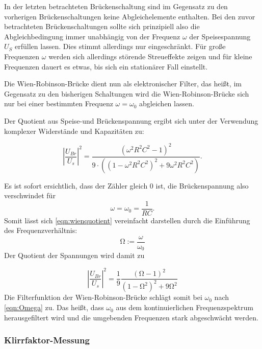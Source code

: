 In der letzten betrachteten Brückenschaltung sind im Gegensatz zu den vorherigen Brückenschaltungen keine Abgleichelemente enthalten.
Bei den zuvor betrachteten Brückenschaltungen sollte sich prinzipiell also die Abgleichbedingung immer unabhängig von der Frequenz $\omega$ der Speisespannung $U_S$ erfüllen lassen. Dies stimmt allerdings nur eingeschränkt. Für große Frequenzen $\omega$ werden sich allerdings störende Streueffekte zeigen und für kleine Frequenzen dauert es etwas, bis sich ein stationärer Fall einstellt.

Die Wien-Robinson-Brücke dient nun als elektronischer Filter, das heißt, im Gegensatz zu den bisherigen Schaltungen wird die Wien-Robinson-Brücke sich nur bei einer bestimmten Frequenz $\omega=\omega_0$ abgleichen lassen.

Der Quotient aus Speise-und Brückenspannung ergibt sich unter der Verwendung komplexer Widerstände und Kapazitäten zu:

\begin{equation}
\label{eqn:wienquotient}
\left|\frac{U_{Br}}{U_s}\right|^2= \frac{(\omega^2R^2C^2-1)^2}{9 \cdot ((1-\omega^2R^2C^2)^2+9\omega^2R^2C^2)} \text{.}
\end{equation}

Es ist sofort ersichtlich, dass der Zähler gleich $0$ ist, die Brückenspannung also verschwindet für
\begin{equation}
  \label{eqn:Omega}
\omega=\omega_0=\frac{1}{RC} .
\end{equation}
Somit lässt sich \eqref{eqn:wienquotient} vereinfacht darstellen durch die Einführung des Frequenzverhältnis:
\begin{equation}
\si{\ohm}:=\frac{\omega}{\omega_0}
\end{equation}
Der Quotient der Spannungen wird damit zu

\begin{equation}
\label{eqn:wienquotienteinfach}
\left|\frac{U_{Br}}{U_s}\right|^2= \frac{1}{9}\frac{(\si{\ohm}-1)^2}{(1-\si{\ohm}^2)^2+9\si{\ohm}^2}
\end{equation}
Die Filterfunktion der Wien-Robinson-Brücke schlägt somit bei $\omega_0$ nach \eqref{eqn:Omega} zu. Das heißt, dass $\omega_0$ aus dem kontinuierlichen Frequenzspektrum herausgefiltert wird und die umgebenden Frequenzen stark abgeschwächt werden.
\subsubsection{Klirrfaktor-Messung}

